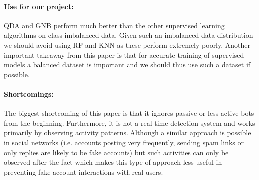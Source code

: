 \paragraph{Use for our project:}
QDA and GNB perform much better than the other supervised learning algorithms on class-imbalanced data. Given such an imbalanced data distribution we should avoid using RF and KNN as these perform extremely poorly. Another important takeaway from this paper is that for accurate training of supervised models a balanced dataset is important and we should thus use such a dataset if possible.

\paragraph{Shortcomings:}
The biggest shortcoming of this paper is that it ignores passive or less active bots from the beginning. Furthermore, it is not a real-time detection system and works primarily by observing activity patterns. Although a similar approach is possible in social networks (i.e. accounts posting very frequently, sending spam links or only replies are likely to be fake accounts) but such activities can only be observed after the fact which makes this type of approach less useful in preventing fake account interactions with real users.
